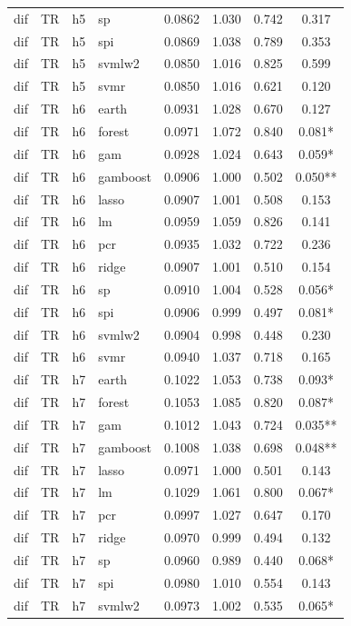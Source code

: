 \begin{ThreePartTable}
\begin{longtable}[t]{llclcccc}
dif & TR & h5 & sp & 0.0862 & 1.030 & 0.742 & 0.317\\
dif & TR & h5 & spi & 0.0869 & 1.038 & 0.789 & 0.353\\
dif & TR & h5 & svmlw2 & 0.0850 & 1.016 & 0.825 & 0.599\\
dif & TR & h5 & svmr & 0.0850 & 1.016 & 0.621 & 0.120\\
\addlinespace
dif & TR & h6 & earth & 0.0931 & 1.028 & 0.670 & 0.127\\
dif & TR & h6 & forest & 0.0971 & 1.072 & 0.840 & 0.081*\\
dif & TR & h6 & gam & 0.0928 & 1.024 & 0.643 & 0.059*\\
dif & TR & h6 & gamboost & 0.0906 & 1.000 & 0.502 & 0.050**\\
dif & TR & h6 & lasso & 0.0907 & 1.001 & 0.508 & 0.153\\
dif & TR & h6 & lm & 0.0959 & 1.059 & 0.826 & 0.141\\
dif & TR & h6 & pcr & 0.0935 & 1.032 & 0.722 & 0.236\\
dif & TR & h6 & ridge & 0.0907 & 1.001 & 0.510 & 0.154\\
dif & TR & h6 & sp & 0.0910 & 1.004 & 0.528 & 0.056*\\
dif & TR & h6 & spi & 0.0906 & 0.999 & 0.497 & 0.081*\\
dif & TR & h6 & svmlw2 & 0.0904 & 0.998 & 0.448 & 0.230\\
dif & TR & h6 & svmr & 0.0940 & 1.037 & 0.718 & 0.165\\
\addlinespace
dif & TR & h7 & earth & 0.1022 & 1.053 & 0.738 & 0.093*\\
dif & TR & h7 & forest & 0.1053 & 1.085 & 0.820 & 0.087*\\
dif & TR & h7 & gam & 0.1012 & 1.043 & 0.724 & 0.035**\\
dif & TR & h7 & gamboost & 0.1008 & 1.038 & 0.698 & 0.048**\\
dif & TR & h7 & lasso & 0.0971 & 1.000 & 0.501 & 0.143\\
dif & TR & h7 & lm & 0.1029 & 1.061 & 0.800 & 0.067*\\
dif & TR & h7 & pcr & 0.0997 & 1.027 & 0.647 & 0.170\\
dif & TR & h7 & ridge & 0.0970 & 0.999 & 0.494 & 0.132\\
dif & TR & h7 & sp & 0.0960 & 0.989 & 0.440 & 0.068*\\
dif & TR & h7 & spi & 0.0980 & 1.010 & 0.554 & 0.143\\
dif & TR & h7 & svmlw2 & 0.0973 & 1.002 & 0.535 & 0.065*\\

\end{longtable}
\end{ThreePartTable}
